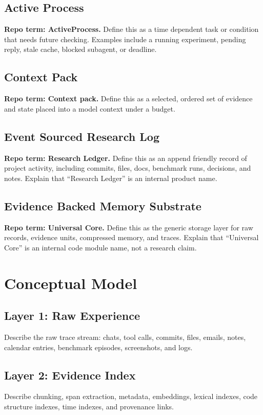 \documentclass[11pt]{article}
\begin{document}
\subsection{Active Process}
\textbf{Repo term: ActiveProcess.} Define this as a time dependent task or condition that needs future checking. Examples include a running experiment, pending reply, stale cache, blocked subagent, or deadline.

\subsection{Context Pack}
\textbf{Repo term: Context pack.} Define this as a selected, ordered set of evidence and state placed into a model context under a budget.

\subsection{Event Sourced Research Log}
\textbf{Repo term: Research Ledger.} Define this as an append friendly record of project activity, including commits, files, docs, benchmark runs, decisions, and notes. Explain that ``Research Ledger'' is an internal product name.

\subsection{Evidence Backed Memory Substrate}
\textbf{Repo term: Universal Core.} Define this as the generic storage layer for raw records, evidence units, compressed memory, and traces. Explain that ``Universal Core'' is an internal code module name, not a research claim.

\section{Conceptual Model}

\subsection{Layer 1: Raw Experience}
Describe the raw trace stream: chats, tool calls, commits, files, emails, notes, calendar entries, benchmark episodes, screenshots, and logs.

\subsection{Layer 2: Evidence Index}
Describe chunking, span extraction, metadata, embeddings, lexical indexes, code structure indexes, time indexes, and provenance links.
\end{document}
